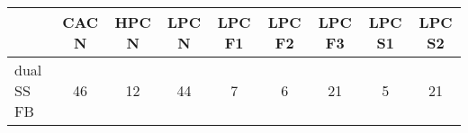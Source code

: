 \begin{minipage}{\linewidth}
    \center
    \footnotesize
    \begin{tabular}{lcccccccc}
        & CAC N & HPC N & LPC N & LPC F1 & LPC F2 & LPC F3 & LPC S1 & LPC S2 \\ \hline
        dual SS FB & 46 & 12 & 44 & 7 & 6 & 21 & 5 & 21 \\ \hline
    \end{tabular}
\end{minipage}
